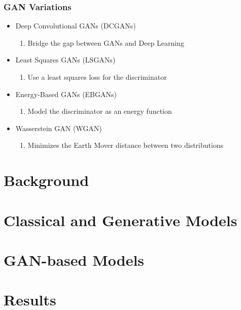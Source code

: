\documentclass{beamer}
\begin{document}
\begin{frame}
\frametitle{\textbf{GAN Variations}}
   \begin{itemize}
      \item Deep Convolutional GANs (DCGANs)
	   \begin{enumerate}[$-$]
         \item Bridge the gap between GANs and Deep Learning
      \end{enumerate}
      \item Least Squares GANs (LSGANs)
	   \begin{enumerate}[$-$]
         \item Use a least squares loss for the discriminator
      \end{enumerate}
      \item Energy-Based GANs (EBGANs)
	   \begin{enumerate}[$-$]
         \item Model the discriminator as an energy function
      \end{enumerate}
      \item Wasserstein GAN (WGAN)
	   \begin{enumerate}[$-$]
         \item Minimizes the Earth Mover distance between two distributions
      \end{enumerate}
   \end{itemize}
\end{frame}


\section*{Background}

\section*{Classical and Generative Models}

\section*{GAN-based Models}

\section*{Results}



\end{document}
